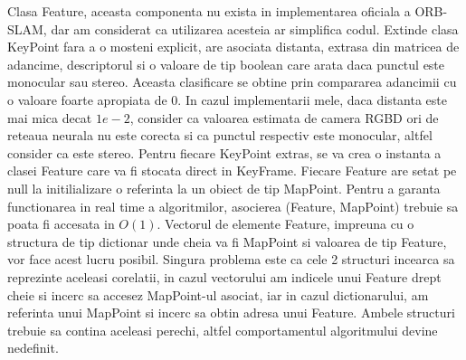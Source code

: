 \documentclass[12pt,a4paper]{report}
\begin{document}
Clasa Feature, aceasta componenta nu exista in implementarea oficiala a ORB-SLAM, dar am considerat 
ca utilizarea acesteia ar simplifica codul. Extinde clasa KeyPoint fara a o mosteni explicit,
are asociata distanta, extrasa din matricea de adancime, descriptorul
si o valoare de tip boolean care arata daca punctul este monocular sau stereo. Aceasta clasificare
 se obtine prin compararea adancimii cu o valoare foarte apropiata
de 0. In cazul implementarii mele, daca distanta este mai mica decat $ 1e-2 $, consider ca valoarea
estimata de camera RGBD ori de reteaua neurala nu este corecta si ca punctul respectiv este
monocular, altfel consider ca este stereo. Pentru fiecare KeyPoint extras,
se va crea o instanta a clasei Feature care va fi stocata direct in KeyFrame. Fiecare
Feature are setat pe null la initilializare o referinta la un obiect 
de tip MapPoint. Pentru a garanta functionarea in real time a algoritmilor, asocierea (Feature,
 MapPoint) trebuie sa poata fi accesata in $ O(1) $. Vectorul de elemente Feature, impreuna cu o
structura de tip dictionar unde cheia va fi MapPoint si valoarea de tip Feature, vor face acest
lucru posibil. Singura problema este ca cele 2 structuri incearca sa 
reprezinte aceleasi corelatii, in cazul vectorului am indicele unui Feature drept cheie si incerc
sa accesez MapPoint-ul asociat, iar in cazul dictionarului, am referinta unui MapPoint si incerc sa
obtin adresa unui Feature. Ambele structuri trebuie sa contina aceleasi perechi, altfel 
comportamentul algoritmului devine nedefinit. \\
\end{document}
